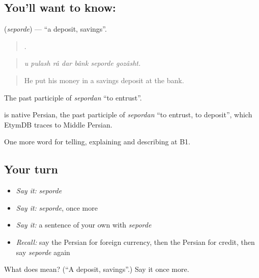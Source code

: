 \subsection*{You'll want to know: }
\textbf{} (\emph{seporde}) — \textquotedblleft{}a deposit, savings\textquotedblright{}.

\begin{quote}
      .
\end{quote}

\begin{quote}
\emph{u pulash râ dar bânk seporde gozâsht.}
\end{quote}

\begin{quote}
He put his money in a savings deposit at the bank.
\end{quote}

The past participle of \emph{sepordan} \textquotedblleft{}to entrust\textquotedblright{}.

\begin{cousinweb}
\textbf{} is native Persian, the past participle of \emph{sepordan} \textquotedblleft{}to entrust, to deposit\textquotedblright{}, which EtymDB traces to Middle Persian.
\end{cousinweb}

\begin{grammarlens}[title={What you've built}]
One more word for telling, explaining and describing at B1.
\end{grammarlens}

\subsection*{Your turn}
\begin{itemize}
\raggedright
  \item \emph{Say it:} \emph{seporde}
  \item \emph{Say it:} \emph{seporde}, once more
  \item \emph{Say it:} a sentence of your own with \emph{seporde}
  \item \emph{Recall:} say the Persian for foreign currency, then the Persian for credit, then say \emph{seporde} again
\end{itemize}

\begin{tcolorbox}[breakable,colback=teal!4,colframe=teal!35!black,title={Before you move on}]
What does  mean? (\textquotedblleft{}A deposit, savings\textquotedblright{}.) Say it once more.
\end{tcolorbox}

